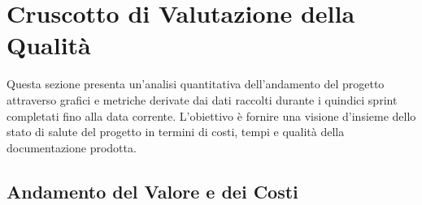 \documentclass[a4paper,11pt,oneside]{scrartcl}
\begin{document}
\newpage
\section{Cruscotto di Valutazione della Qualità}

Questa sezione presenta un'analisi quantitativa dell'andamento del progetto attraverso grafici e metriche derivate dai dati raccolti durante i quindici sprint completati fino alla data corrente. L'obiettivo è fornire una visione d'insieme dello stato di salute del progetto in termini di costi, tempi e qualità della documentazione prodotta.

\subsection{Andamento del Valore e dei Costi}
\end{document}
